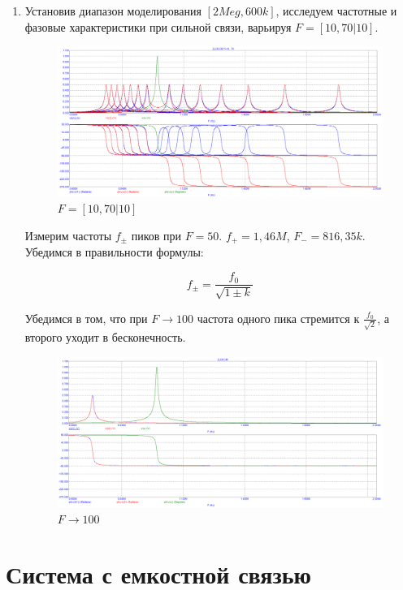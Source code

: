 \documentclass[a4paper, 14pt]{article}%
\begin{document}
\begin{enumerate}
\newpage

\item Установив диапазон моделирования $[2Meg, 600k]$, исследуем частотные и фазовые характеристики при сильной связи, варьируя $F = [10,70|10]$. 

\begin{figure}[h!]
\centering
\includegraphics[scale = 0.4]{images/plot11_1.png}
\caption{$F = [10,70|10]$}
\label{fig:Image1}
\end{figure}

Измерим частоты $f_{\pm}$ пиков при $F = 50$. $f_+ = 1,46M$, $F_- = 816,35k$. Убедимся в правильности формулы:

\[f_{\pm} = \frac{f_0}{\sqrt{1\pm k}}\]

Убедимся в том, что при $F \longrightarrow 100$ частота одного пика стремится к $\frac{f_0}{\sqrt{2}}$, а второго уходит в бесконечность.

\begin{figure}[h!]
\centering
\includegraphics[scale = 0.4]{images/plot11_2.png}
\caption{$F \longrightarrow 100$}
\label{fig:Image1}
\end{figure}

\end{enumerate}

\newpage

\section{Система с емкостной связью}
\end{document}
